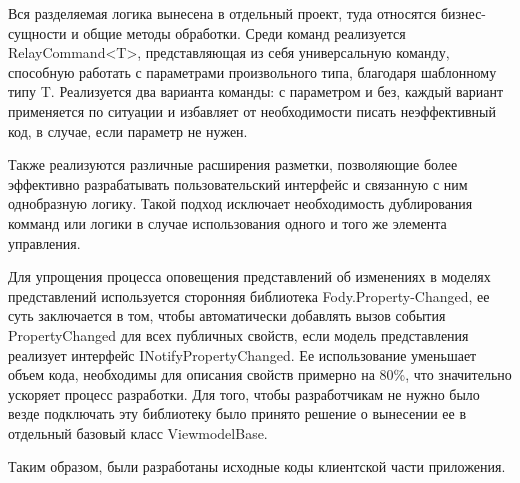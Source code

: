 Вся разделяемая логика вынесена в отдельный проект, туда относятся бизнес-сущности и общие методы обработки. Среди команд реализуется RelayCommand<T>, представляющая из себя
универсальную команду, способную работать с параметрами произвольного типа, благодаря шаблонному типу T. Реализуется два варианта команды: с параметром и без, каждый вариант
применяется по ситуации и избавляет от необходимости писать неэффективный код, в случае, если параметр не нужен.

Также реализуются различные расширения разметки, позволяющие более эффективно разрабатывать пользовательский интерфейс и связанную с ним однобразную логику. Такой подход
исключает необходимость дублирования комманд или логики в случае использования одного и того же элемента управления.

Для упрощения процесса оповещения представлений об изменениях в моделях представлений используется сторонняя библиотека Fody.Property-Changed, ее суть заключается в том,
чтобы автоматически добавлять вызов события PropertyChanged для всех публичных свойств, если модель представления реализует интерфейс INotifyPropertyChanged. Ее использование
уменьшает объем кода, необходимы для описания свойств примерно на 80\%, что значительно ускоряет процесс разработки. Для того, чтобы разработчикам не нужно было везде подключать
эту библиотеку было принято решение о вынесении ее в отдельный базовый класс ViewmodelBase.

Таким образом, были разработаны исходные коды клиентской части приложения. 